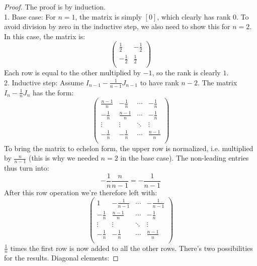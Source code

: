 \documentclass[12pt, a4paper]{article}
\begin{document}
\begin{proof}
The proof is by induction.\\
1. Base case: For $n=1$, the matrix is simply $[0]$, which clearly has rank $0$. To avoid division by zero in the inductive step, we also need to show this for $n=2$. In this case, the matrix is:
\begin{equation}
\begin{pmatrix}
	\frac{1}{2} 	& -\frac{1}{2} \\
	-\frac{1}{2}	& \frac{1}{2} \\
\end{pmatrix}
\end{equation}
Each row is equal to the other multiplied by $-1$, so the rank is clearly $1$.\\
2. Inductive step: Assume $I_{n-1}-\frac{1}{n-1}J_{n-1}$ to have rank $n-2$. The matrix $I_n-\frac{1}{n}J_n$ has the form:
\begin{equation}
\begin{pmatrix}
	 \frac{n-1}{n}	& -\frac{1}{n} 	& \cdots	& -\frac{1}{n} \\
	 -\frac{1}{n}	& \frac{n-1}{n}	& \cdots	& -\frac{1}{n} \\
	 \vdots			& \vdots		& \ddots	& \vdots \\
	 -\frac{1}{n}	& -\frac{1}{n}	& \cdots	& \frac{n-1}{n} \\
\end{pmatrix}
\end{equation}
To bring the matrix to echelon form, the upper row is normalized, i.e. multiplied by $\frac{n}{n-1}$ (this is why we needed $n=2$ in the base case). The non-leading entries thus turn into:
\begin{equation}
-\frac{1}{n}\frac{n}{n-1}=-\frac{1}{n-1}
\end{equation}
After this row operation we're therefore left with:
\begin{equation}
\begin{pmatrix}
	 1				& -\frac{1}{n-1}& \cdots	& -\frac{1}{n-1} \\
	 -\frac{1}{n}	& \frac{n-1}{n}	& \cdots	& -\frac{1}{n} \\
	 \vdots			& \vdots		& \ddots	& \vdots \\
	 -\frac{1}{n}	& -\frac{1}{n}	& \cdots	& \frac{n-1}{n} \\
\end{pmatrix}
\end{equation}
$\frac{1}{n}$ times the first row is now added to all the other rows. There's two possibilities for the results. Diagonal elements:

\end{proof}
\end{document}
